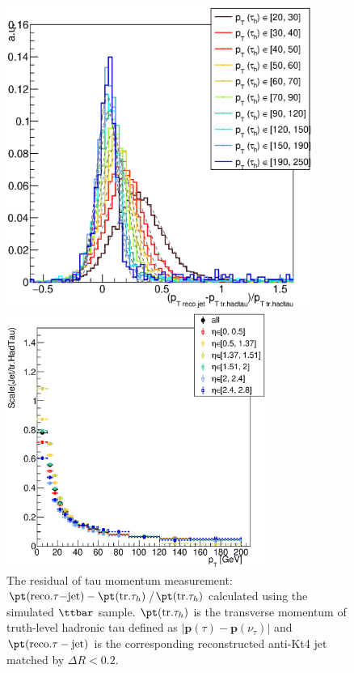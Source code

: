 \clearpage
\begin{figure}[htbp]
  \begin{center}
      \includegraphics[width=100mm]{figures/BGestimation/ObjReplacement/method/tauRF/ptResidual.eps} 
      \caption{The residual of tau momentum measurement: $\pt(\mathrm{reco. } \tau\mathrm{-jet})-\pt(\mathrm{tr. } \tau_{h})$/$\pt(\mathrm{tr.} \tau_{h})$ calculated using the simulated $\ttbar$ sample. $\pt(\mathrm{tr.} \tau_{h})$ is the transverse momentum of truth-level hadronic tau defined as $|\bm{p}(\tau)-\bm{p}(\nu_{\tau})|$ and $\pt(\mathrm{reco.} \tau-\mathrm{jet})$ is the corresponding reconstructed anti-Kt4 jet matched by $\Delta R<0.2$. }
      \label{fig::BGestimation::objRep::tau_ptResidual}
    \begin{minipage}[t]{.45\textwidth}
      \centering        
      \includegraphics[width=85mm]{figures/BGestimation/ObjReplacement/method/tauRF/tauJet_scale.eps} 

\end{minipage}
\end{center}
\end{figure}
